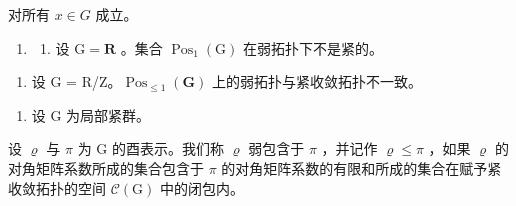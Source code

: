对所有 \(x \in G\) 成立。

\begin{enumerate}
\def\labelenumi{\arabic{enumi})}
\setcounter{enumi}{9}
\tightlist
\item
  \begin{enumerate}
  \def\labelenumii{\alph{enumii})}
  \tightlist
  \item
    设 \(\mathrm{G} = \mathbf{R}\) 。集合 \(\operatorname{Pos}_1(\mathrm{G})\) 在弱拓扑下不是紧的。
  \end{enumerate}
\end{enumerate}

\begin{enumerate}
\def\labelenumi{\alph{enumi})}
\setcounter{enumi}{1}
\tightlist
\item
  设 G = R/Z。\(\operatorname{Pos}_{\leqslant1}(\mathbf{G})\) 上的弱拓扑与紧收敛拓扑不一致。
\end{enumerate}

\begin{enumerate}
\def\labelenumi{\arabic{enumi})}
\setcounter{enumi}{10}
\tightlist
\item
  设 G 为局部紧群。
\end{enumerate}

设 \(\varrho\) 与 \(\pi\) 为 G 的酉表示。我们称 \(\varrho\) 弱包含于 \(\pi\) ，并记作 \(\varrho \leqslant \pi\) ，如果 \(\varrho\) 的对角矩阵系数所成的集合包含于 \(\pi\) 的对角矩阵系数的有限和所成的集合在赋予紧收敛拓扑的空间 \(\mathcal{C}(\mathrm{G})\) 中的闭包内。

